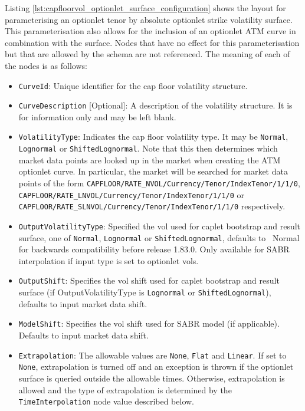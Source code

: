 Listing \ref{lst:capfloorvol_optionlet_surface_configuration} shows the layout for parameterising an optionlet tenor by absolute optionlet strike volatility surface. This parameterisation also allows for the inclusion of an optionlet ATM curve in combination with the surface. Nodes that have no effect for this parameterisation but that are allowed by the schema are not referenced. The meaning of each of the nodes is as follows:

\begin{itemize}
\item
\lstinline!CurveId!: Unique identifier for the cap floor volatility structure.

\item \lstinline!CurveDescription! [Optional]:
A description of the volatility structure. It is for information only and may be left blank.

\item \lstinline!VolatilityType!:
Indicates the cap floor volatility type. It may be \lstinline!Normal!, \lstinline!Lognormal! or \lstinline!ShiftedLognormal!. Note that this then determines which market data points are looked up in the market when creating the ATM optionlet curve. In particular, the market will be searched for market data points of the form \lstinline!CAPFLOOR/RATE_NVOL/Currency/Tenor/IndexTenor/1/1/0!, \lstinline!CAPFLOOR/RATE_LNVOL/Currency/Tenor/IndexTenor/1/1/0! or \lstinline!CAPFLOOR/RATE_SLNVOL/Currency/Tenor/IndexTenor/1/1/0! respectively.

\item \lstinline!OutputVolatilityType!: Specified the vol used for caplet bootstrap and result surface, one of {\tt Normal},
  {\tt Lognormal} or {\tt ShiftedLognormal}, defaults to {\ Normal} for backwards compatibility before release
  1.83.0. Only available for SABR interpolation if input type is set to optionlet vols.

\item \lstinline!OutputShift!: Specifies the vol shift used for caplet bootstrap and result surface (if OutputVolatilityType is 
{\tt Lognormal} or {\tt ShiftedLognormal}), defaults to input market data shift. 

\item \lstinline!ModelShift!: Specifies the vol shift used for SABR model (if applicable). Defaults to input market data shift. 

\item \lstinline!Extrapolation!:
The allowable values are \lstinline!None!, \lstinline!Flat! and \lstinline!Linear!. If set to \lstinline!None!, extrapolation is turned off and an exception is thrown if the optionlet surface is queried outside the allowable times. Otherwise, extrapolation is allowed and the type of extrapolation is determined by the \lstinline!TimeInterpolation! node value described below.


\end{itemize}
